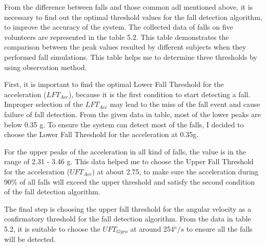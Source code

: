 \documentclass[letterpaper,12pt,titlepage,oneside,final]{book}
\begin{document}
From the difference between falls and those common \gls{adl} mentioned above, it is necessary to find out the optimal threshold values for the fall detection algorithm, to improve the accuracy of the system. The collected data of falls on five volunteers are represented in the table 5.2. This table demonstrates the comparison between the peak values resulted by different subjects when they performed fall simulations. This table helps me to determine three thresholds by using observation method.\par  
First, it is important to find the optimal Lower Fall Threshold for the acceleration ($LFT_{Acc}$), because it is the first condition to start detecting a fall. Improper selection of the $LFT_{Acc}$ may lead to the miss of the fall event and cause failure of fall detection. From the given data in table, most of the lower peaks are below 0.35 g. To ensure the system can detect most of the falls, I decided to choose the Lower Fall Threshold for the acceleration at 0.35g.
\par
For the upper peaks of the acceleration in all kind of falls, the value is in the range of 2.31 - 3.46 g. This data helped me to choose the Upper Fall Threshold for the acceleration ($UFT_{Acc}$) at about 2.75, to make sure the acceleration during 90\% of all falls will exceed the upper threshold and satisfy the second condition of the fall detection algorithm. 
\par 
The final step is choosing the upper fall threshold for the angular velocity as a confirmatory threshold for the fall detection algorithm. From the data in table 5.2, it is suitable to choose the $UFT_{Gyro}$ at around 254$^{o}/s$ to ensure all the falls will be detected. 
\end{document}
